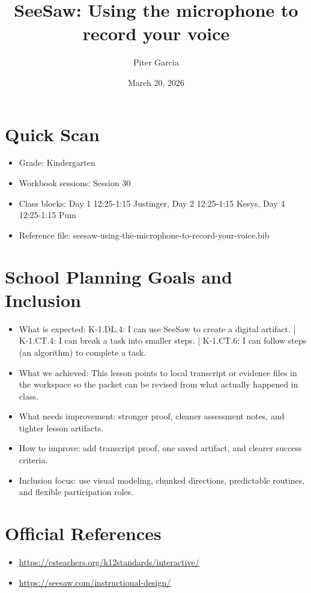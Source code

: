 \documentclass[11pt]{article}
\title{SeeSaw: Using the microphone to record your voice}
\author{Piter Garcia}
\date{March 20, 2026}
\begin{document}
    \maketitle
    \section*{Quick Scan}
    \begin{itemize}[leftmargin=*]
    \item Grade: Kindergarten
    \item Workbook sessions: Session 30
    \item Class blocks: Day 1 12:25-1:15 Justinger, Day 2 12:25-1:15 Kesys, Day 4 12:25-1:15 Pum
    \item Reference file: seesaw-using-the-microphone-to-record-your-voice.bib
    \end{itemize}
    \section*{School Planning Goals and Inclusion}
    \begin{itemize}[leftmargin=*]
    \item What is expected: K-1.DL.4: I can use SeeSaw to create a digital artifact. | K-1.CT.4: I can break a task into smaller steps. | K-1.CT.6: I can follow steps (an algorithm) to complete a task.
    \item What we achieved: This lesson points to local transcript or evidence files in the workspace so the packet can be revised from what actually happened in class.
    \item What needs improvement: stronger proof, cleaner assessment notes, and tighter lesson artifacts.
    \item How to improve: add transcript proof, one saved artifact, and clearer success criteria.
    \item Inclusion focus: use visual modeling, chunked directions, predictable routines, and flexible participation roles.
    \end{itemize}
    \section*{Official References}
    \begin{itemize}[leftmargin=*]
    \item \url{https://csteachers.org/k12standards/interactive/}
\item \url{https://seesaw.com/instructional-design/}

    \end{itemize}
    
\end{document}
